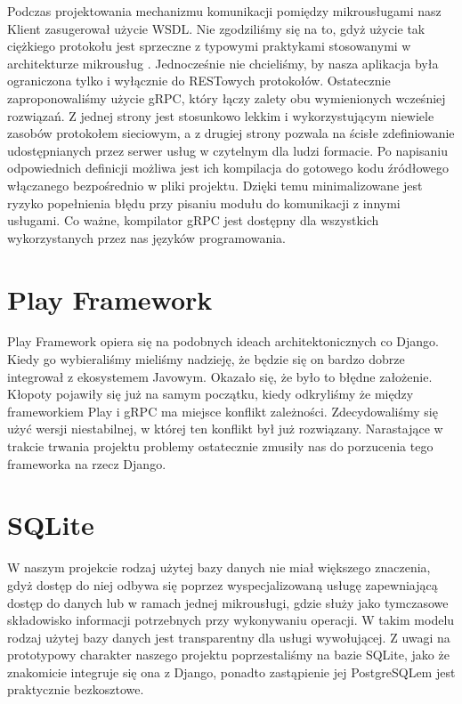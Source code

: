 \documentclass[licencjacka]{pracamgr}
\begin{document}
Podczas projektowania mechanizmu komunikacji pomiędzy mikrousługami nasz Klient
zasugerował użycie WSDL. Nie zgodziliśmy się na to, gdyż użycie tak ciężkiego
protokołu jest sprzeczne z typowymi praktykami stosowanymi w architekturze
mikrousług \cite{mammatustech}. Jednocześnie nie chcieliśmy, by nasza aplikacja
była ograniczona tylko i wyłącznie do RESTowych protokołów. Ostatecznie
zaproponowaliśmy użycie gRPC, który łączy zalety obu wymienionych wcześniej
rozwiązań. Z jednej strony jest stosunkowo lekkim i wykorzystującym niewiele
zasobów protokołem sieciowym, a z drugiej strony pozwala na ścisłe zdefiniowanie
udostępnianych przez serwer usług w czytelnym dla ludzi formacie. Po napisaniu
odpowiednich definicji możliwa jest ich kompilacja do gotowego kodu źródłowego
włączanego bezpośrednio w pliki projektu. Dzięki temu minimalizowane jest ryzyko
popełnienia błędu przy pisaniu modułu do komunikacji z innymi usługami. Co ważne,
kompilator gRPC jest dostępny dla wszystkich wykorzystanych przez nas języków
programowania.

\section{Play Framework}

Play Framework opiera się na podobnych ideach architektonicznych co Django. Kiedy
go wybieraliśmy mieliśmy nadzieję, że będzie się on bardzo dobrze integrował z
ekosystemem Javowym. Okazało się, że było to błędne założenie. Kłopoty pojawiły
się już na samym początku, kiedy odkryliśmy że między frameworkiem Play i gRPC ma
miejsce konflikt zależności. Zdecydowaliśmy się użyć wersji niestabilnej, w
której ten konflikt był już rozwiązany. Narastające w trakcie trwania projektu
problemy ostatecznie zmusiły nas do porzucenia tego frameworka na rzecz Django.

\section{SQLite}

W naszym projekcie rodzaj użytej bazy danych nie miał większego znaczenia, gdyż
dostęp do niej odbywa się poprzez wyspecjalizowaną usługę zapewniającą dostęp do
danych lub w ramach jednej mikrousługi, gdzie służy jako tymczasowe składowisko
informacji potrzebnych przy wykonywaniu operacji. W takim modelu rodzaj użytej
bazy danych jest transparentny dla usługi wywołującej. Z uwagi na prototypowy
charakter naszego projektu poprzestaliśmy na bazie SQLite, jako że znakomicie
integruje się ona z Django, ponadto zastąpienie jej PostgreSQLem jest
praktycznie bezkosztowe.
\end{document}
